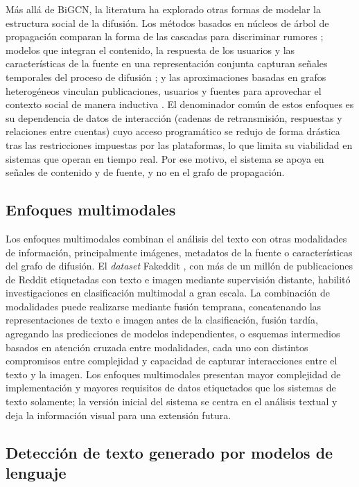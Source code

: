Más allá de BiGCN, la literatura ha explorado otras formas de modelar la estructura social de la difusión. Los métodos basados en núcleos de árbol de propagación comparan la forma de las cascadas para discriminar rumores \parencite{MaEtAl2017}; modelos que integran el contenido, la respuesta de los usuarios y las características de la fuente en una representación conjunta capturan señales temporales del proceso de difusión \parencite{RuchanskyEtAl2017}; y las aproximaciones basadas en grafos heterogéneos vinculan publicaciones, usuarios y fuentes para aprovechar el contexto social de manera inductiva \parencite{NguyenEtAl2020}. El denominador común de estos enfoques es su dependencia de datos de interacción (cadenas de retransmisión, respuestas y relaciones entre cuentas) cuyo acceso programático se redujo de forma drástica tras las restricciones impuestas por las plataformas, lo que limita su viabilidad en sistemas que operan en tiempo real. Por ese motivo, el sistema se apoya en señales de contenido y de fuente, y no en el grafo de propagación.

\subsection{Enfoques multimodales}

Los enfoques multimodales combinan el análisis del texto con otras modalidades de información, principalmente imágenes, metadatos de la fuente o características del grafo de difusión. El \textit{dataset} Fakeddit \parencite{NakamuraEtAl2020}, con más de un millón de publicaciones de Reddit etiquetadas con texto e imagen mediante supervisión distante, habilitó investigaciones en clasificación multimodal a gran escala. La combinación de modalidades puede realizarse mediante fusión temprana, concatenando las representaciones de texto e imagen antes de la clasificación, fusión tardía, agregando las predicciones de modelos independientes, o esquemas intermedios basados en atención cruzada entre modalidades, cada uno con distintos compromisos entre complejidad y capacidad de capturar interacciones entre el texto y la imagen. Los enfoques multimodales presentan mayor complejidad de implementación y mayores requisitos de datos etiquetados que los sistemas de texto solamente; la versión inicial del sistema se centra en el análisis textual y deja la información visual para una extensión futura.

\subsection{Detección de texto generado por modelos de lenguaje}

